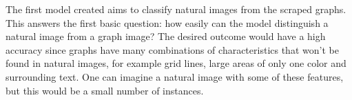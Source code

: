 \documentclass[12pt]{article}
\begin{document}
            \begin{table}[htp]

                \begin{center} 


                \caption{Model Information for classifying graphs from natural images}
                \label{cifar-graphs-1}

                \end{center}

            \end{table}


            The first model created aims to classify natural images from the scraped graphs. 
            This answers the first basic question: how easily can the model distinguish a natural image from a graph image? 
            The desired outcome would have a high accuracy since graphs have many combinations of characteristics 
            that won’t be found in natural images, for example grid lines, large areas of only one color and surrounding text. 
            One can imagine a natural image with some of these features, but this would be a small number of instances. 
            
\end{document}
